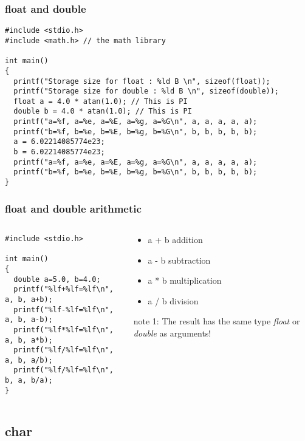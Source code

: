 \documentclass[10pt]{beamer}
\begin{document}
\begin{frame}[fragile]
  \frametitle{float and double}
  \centering

    \begin{lstlisting}
#include <stdio.h>
#include <math.h> // the math library

int main()
{
  printf("Storage size for float : %ld B \n", sizeof(float));
  printf("Storage size for double : %ld B \n", sizeof(double));
  float a = 4.0 * atan(1.0); // This is PI
  double b = 4.0 * atan(1.0); // This is PI
  printf("a=%f, a=%e, a=%E, a=%g, a=%G\n", a, a, a, a, a);
  printf("b=%f, b=%e, b=%E, b=%g, b=%G\n", b, b, b, b, b);
  a = 6.02214085774e23;
  b = 6.02214085774e23;
  printf("a=%f, a=%e, a=%E, a=%g, a=%G\n", a, a, a, a, a);
  printf("b=%f, b=%e, b=%E, b=%g, b=%G\n", b, b, b, b, b);
}
    \end{lstlisting}
\end{frame}

\begin{frame}[fragile]
  \frametitle{float and double arithmetic}
  \centering

  \begin{columns}
    \begin{column}{0.55\textwidth}
    \begin{lstlisting}
#include <stdio.h>

int main()
{
  double a=5.0, b=4.0;
  printf("%lf+%lf=%lf\n", a, b, a+b);
  printf("%lf-%lf=%lf\n", a, b, a-b);
  printf("%lf*%lf=%lf\n", a, b, a*b);
  printf("%lf/%lf=%lf\n", a, b, a/b);
  printf("%lf/%lf=%lf\n", b, a, b/a);
}
    \end{lstlisting}
    \end{column}
    \begin{column}{0.48\textwidth}
      \begin{itemize}
        \item a + b addition
        \item a - b subtraction
        \item a * b multiplication
        \item a / b division
      \end{itemize}
      {note 1: The result has the same type {\it float} or {\it double} as arguments!}
    \end{column}
  \end{columns}
\end{frame}

\subsection{char}
\end{document}
